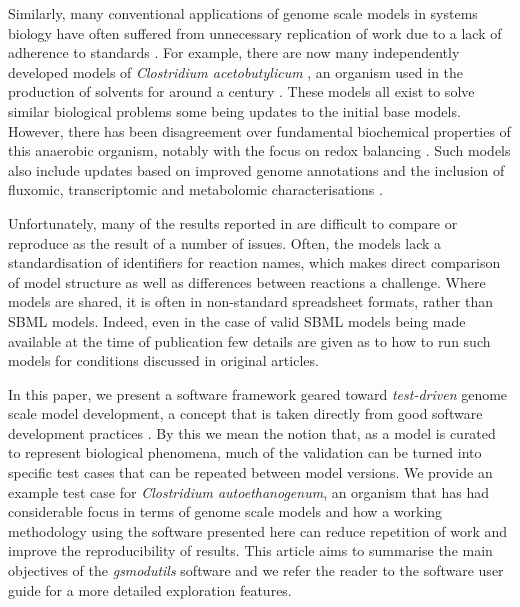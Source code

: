 \documentclass[journal=asbcd6]{achemso}
\begin{document}
Similarly, many conventional applications of genome scale models in systems biology have often suffered from unnecessary replication of work due to a lack of adherence to standards \cite{monk2014}.
For example, there are now many independently developed models of \textit{Clostridium acetobutylicum} \cite{lee2008genome, senger2008genome, mcanulty2012genome, dash2014capturing, yoo2015quantitative}, an organism used in the production of solvents for around a century \cite{moon2016one, 1919charles}.
These models all exist to solve similar biological problems some being updates to the initial base models. 
However, there has been disagreement over fundamental biochemical properties of this anaerobic organism, notably with the focus on redox balancing \cite{dash2014capturing}.
Such models also include updates based on improved genome annotations and the inclusion of fluxomic, transcriptomic and metabolomic characterisations \cite{yoo2015quantitative}.


Unfortunately, many of the results reported in \cite{lee2008genome, senger2008genome, mcanulty2012genome, dash2014capturing, yoo2015quantitative} are difficult to compare or reproduce as the result of a number of issues.
Often, the models lack a standardisation of identifiers for reaction names, which makes direct comparison of model structure as well as differences between reactions a challenge.
Where models are shared, it is often in non-standard spreadsheet formats, rather than SBML models.
Indeed, even in the case of valid SBML models being made available at the time of publication few details are given as to how to run such models for conditions discussed in original articles.

In this paper, we present a software framework geared toward \textit{test-driven} genome scale model development, a concept that is taken directly from good software development practices \cite{martin2002agile}.
By this we mean the notion that, as a model is curated to represent biological phenomena, much of the validation can be turned into specific test cases that can be repeated between model versions.
We provide an example test case for \textit{Clostridium autoethanogenum}, an organism that has had considerable focus in terms of genome scale models and how a working methodology using the software presented here can reduce repetition of work and improve the reproducibility of results.
This article aims to summarise the main objectives of the \textit{gsmodutils} software and we refer the reader to the software user guide for a more detailed exploration features.
\end{document}
